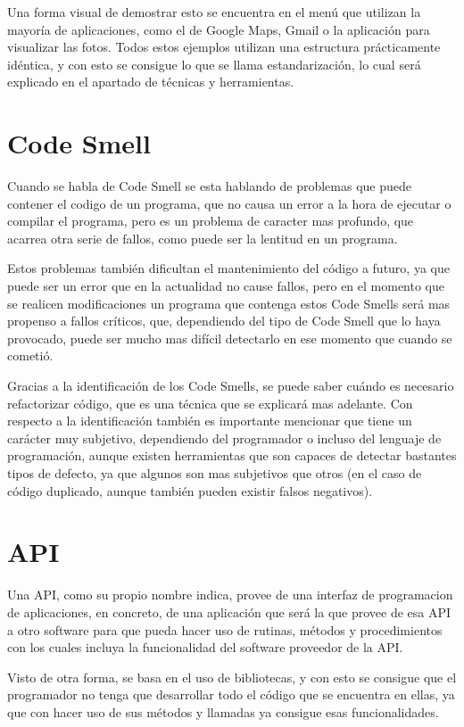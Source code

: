 Una forma visual de demostrar esto se encuentra en el menú que utilizan la mayoría de aplicaciones, como el de Google Maps, Gmail o la aplicación para visualizar las fotos. Todos estos ejemplos utilizan una estructura prácticamente idéntica, y con esto se consigue lo que se llama estandarización, lo cual será explicado en el apartado de técnicas y herramientas.

\section{Code Smell}

Cuando se habla de Code Smell se esta hablando de problemas que puede contener el codigo de un programa, que no causa un error a la hora de ejecutar o compilar el programa, pero es un problema de caracter mas profundo, que acarrea otra serie de fallos, como puede ser la lentitud en un programa.

Estos problemas también dificultan el mantenimiento del código a futuro, ya que puede ser un error que en la actualidad no cause fallos, pero en el momento que se realicen modificaciones un programa que contenga estos Code Smells será mas propenso a fallos críticos, que, dependiendo del tipo de Code Smell que lo haya provocado, puede ser mucho mas difícil detectarlo en ese momento que cuando se cometió.

Gracias a la identificación de los Code Smells, se puede saber cuándo es necesario refactorizar código, que es una técnica que se explicará mas adelante. Con respecto a la identificación también es importante mencionar que tiene un carácter muy subjetivo, dependiendo del programador o incluso del lenguaje de programación, aunque existen herramientas que son capaces de detectar bastantes tipos de defecto, ya que algunos son mas subjetivos que otros (en el caso de código duplicado, aunque también pueden existir falsos negativos).

\section{API}

Una API, como su propio nombre indica, provee de una interfaz de programacion de aplicaciones, en concreto, de una aplicación que será la que provee de esa API a otro software para que pueda hacer uso de rutinas, métodos y procedimientos con los cuales incluya la funcionalidad del software proveedor de la API.

Visto de otra forma, se basa en el uso de bibliotecas, y con esto se consigue que el programador no tenga que desarrollar todo el código que se encuentra en ellas, ya que con hacer uso de sus métodos y llamadas ya consigue esas funcionalidades.

